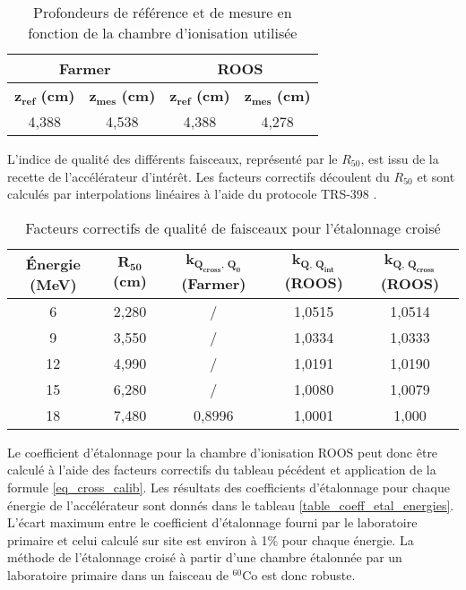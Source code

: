 \documentclass{article}
\begin{document}
\begin{table}[h!]
  \centering
  \begin{tabular}{|cc|cc|}
  \hline
  \multicolumn{2}{|c|}{\textbf{Farmer}} & \multicolumn{2}{c|}{\textbf{ROOS}} \\ \hline
  $\mathbf{z_{ref}}$ \textbf{(cm)} & $\mathbf{z_{mes}}$ \textbf{(cm)} & $\mathbf{z_{ref}}$ \textbf{(cm)} & $\mathbf{z_{mes}}$ \textbf{(cm)} \\ \hline
  4,388 & 4,538 & 4,388 & 4,278 \\ \hline
  \end{tabular}
  \caption{Profondeurs de référence et de mesure en fonction de la chambre d'ionisation utilisée}
  \label{table_profondeurs_mesures}
\end{table}

L'indice de qualité des différents faisceaux, représenté par le $R_{50}$, est issu de la recette de l'accélérateur d'intérêt. Les facteurs correctifs découlent du $R_{50}$ et sont calculés par interpolations linéaires à l'aide du protocole TRS-398 \cite{international2001iaea}.

\begin{table}[h]
  \centering
  \begin{tabular}{ccccc}
    \toprule
    \textbf{Énergie (MeV)} & $\mathbf{R_{50}}$ \textbf{(cm)} & $\mathbf{k_{Q_{cross},\, Q_0}}$ \textbf{(Farmer)} & $\mathbf{k_{Q,\, Q_{int}}}$ \textbf{(ROOS)} & $\mathbf{k_{Q,\, Q_{cross}}}$ \textbf{(ROOS)} \\
    \toprule
    6 & 2,280 & / & 1,0515 & 1,0514 \\
    9 & 3,550 & / & 1,0334 & 1,0333 \\
    12 & 4,990 & / & 1,0191 & 1,0190 \\
    15 & 6,280 & / & 1,0080 & 1,0079 \\
    18 & 7,480 & 0,8996 & 1,0001 & 1,000 \\
    \bottomrule
  \end{tabular}
  \caption{Facteurs correctifs de qualité de faisceaux pour l'étalonnage croisé}
  \label{table_facteurs_corr_etal}
\end{table}

Le coefficient d'étalonnage pour la chambre d'ionisation ROOS peut donc être calculé à l'aide des facteurs correctifs du tableau pécédent et application de la formule \ref*{eq_cross_calib}. Les résultats des coefficients d'étalonnage pour chaque énergie de l'accélérateur sont donnés dans le tableau \ref*{table_coeff_etal_energies}. L'écart maximum entre le coefficient d'étalonnage fourni par le laboratoire primaire et celui calculé sur site est environ à 1\% pour chaque énergie. La méthode de l'étalonnage croisé à partir d'une chambre étalonnée par un laboratoire primaire dans un faisceau de $^{60}$Co est donc robuste.
\end{document}
